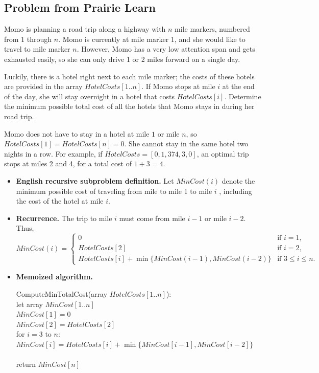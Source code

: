 \documentclass[11pt]{article}
\begin{document}
\newpage

\subsection*{Problem from Prairie Learn}
Momo is planning a road trip along a highway with $n$ mile markers, numbered
from $1$ through $n$. Momo is currently at mile marker $1$, and she would like
to travel to mile marker $n$. However, Momo has a very low attention span and
gets exhausted easily, so she can only drive 1 or 2 miles forward on a single
day.

Luckily, there is a hotel right next to each mile marker; the costs of these
hotels are provided in the array $HotelCosts[1..n]$. If Momo stops at mile $i$
at the end of the day, she will stay overnight in a hotel that costs
$HotelCosts[i]$. Determine the minimum possible total cost of all the hotels
that Momo stays in during her road trip.

Momo does not have to stay in a hotel at mile $1$ or mile $n$, so
$HotelCosts[1]=HotelCosts[n]=0$. She cannot stay in the same hotel two nights
in a row. For example, if $HotelCosts=[0,1,374,3,0]$, an optimal trip stops at
miles 2 and 4, for a total cost of $1+3=4$.
\begin{itemize}
    \item 
\textbf{English recursive subproblem definition.} Let
$MinCost(i)$ denote the minimum possible cost of traveling from mile
to mile 1 to mile $i$ , including the cost of the hotel at mile $i$.
\item
\textbf{Recurrence.} The trip to mile $i$ must come from mile $i-1$ or
 mile $i-2$. Thus,
\[
MinCost(i)=
\begin{cases}
0 & \text{if } i=1,\\
HotelCosts[2] & \text{if } i=2,\\
HotelCosts[i]+\min\{MinCost(i-1),MinCost(i-2)\} & \text{if } 3\leq i\leq n.
\end{cases}
\]
\item 
\textbf{Memoized algorithm.} 
\begin{algo}
ComputeMinTotalCost(array $HotelCosts[1..n]$):\+\\
	let array $MinCost[1..n]$\\
	$MinCost[1] = 0$\\
	$MinCost[2] = HotelCosts[2]$\\
	for $i = 3$ to $n$:\+\\
		$MinCost[i] = HotelCosts[i] + \min\{MinCost[i-1], MinCost[i-2]\}$\\
	\-\\
	return $MinCost[n]$\-\\
\end{algo}
\end{itemize}
\end{document}
